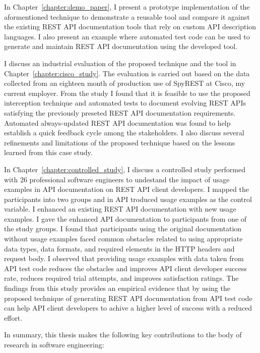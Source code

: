 In Chapter~\ref{chapter:demo_paper}, I present a prototype implementation of the aformentioned technique to demonstrate a reusable tool and compare it against the existing REST API documentation tools that rely on custom API description languages. I also present an example where automated test code can be used to generate and maintain REST API documentation using the developed tool.

I discuss an industrial evaluation of the proposed technique and the tool in Chapter~\ref{chapter:cisco_study}. The evaluation is carried out based on the data collected from an eighteen month of production use of SpyREST at Cisco, my current employer. From the study I found that it is feasible to use the proposed interception technique and automated tests to document evolving REST APIs satisfying the previously preseted REST API documentation requirements. Automated always-updated REST API documentation was found to help establish a quick feedback cycle among the stakeholders. I also discuss several refinements and limitations of the proposed technique based on the lessons learned from this case study.

In Chapter~\ref{chapter:controlled_study}, I discuss a controlled study performed with 26 professional software engineers to undestand the impact of usage examples in API documentation on REST API client developers. I mapped the participants into two groups and in API troduced usage examples as the control variable. I enhanced an existing REST API documentation with new usage examples. I gave the enhanced API documentation to participants from one of the study groups. I found that participants using the original documentation without usage examples faced common obstacles related to using appropriate data types, data formats, and required elements in the HTTP headers and request body. I observed that providing usage examples with data taken from API test code reduces the obstacles and improves API client developer success rate, reduces required trial attempts, and improves satisfaction ratings. The findings from this study provides an empirical evidence that by using the proposed technique of generating REST API documentation from API test code can help API client developers to achive a higher level of success with a reduced effort.

In summary, this thesis makes the following key contributions to the body of research in software engineering:

